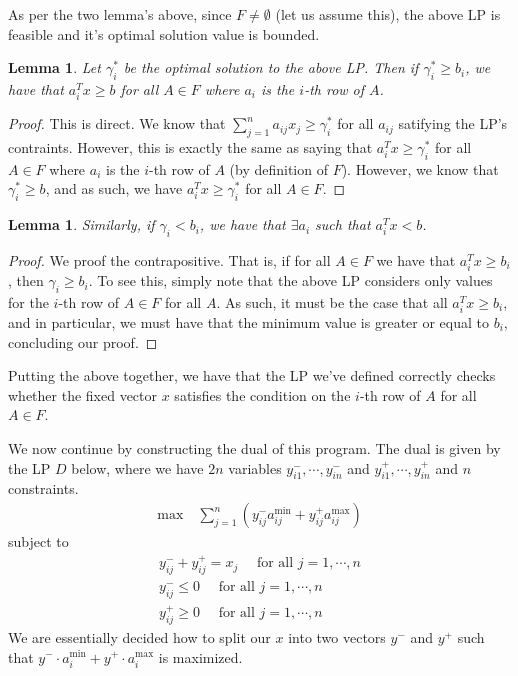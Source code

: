 \documentclass[12pt]{exam}
\newtheorem{lemma}[theorem]{Lemma}
\begin{document}
\begin{questions}
\begin{solution}
\begin{enumerate}[label=(\alph*)]
    As per the two lemma's above, since $F \neq \emptyset$ (let us assume this), the above LP is feasible and it's optimal solution value is bounded.

    \begin{lemma}
      Let $\gamma^*_i$ be the optimal solution to the above LP. Then if $\gamma_i^* \geq b_i$, we have that $a_i^Tx \geq b$ for all $A \in F$ where $a_i$ is the $i$-th row of $A$.
    \end{lemma}
    \begin{proof}
      This is direct. We know that $\sum_{j=1}^n a_{ij} x_j \geq \gamma_i^*$ for all $a_{ij}$ satifying the LP's contraints. However, this is exactly the same as saying that $a_i^T x \geq \gamma_i^*$ for all $A \in F$ where $a_i$ is the $i$-th row of $A$ (by definition of $F$). However, we know that $\gamma_i^* \geq b$, and as such, we have $a_i^T x \geq \gamma_i^*$ for all $A \in F$.
    \end{proof}

    \begin{lemma}
      Similarly, if $\gamma_i < b_i$, we have that $\exists a_i$ such that $a_i^Tx < b$.
    \end{lemma}
    \begin{proof}
      We proof the contrapositive. That is, if for all $A \in F$ we have that $a_i^Tx \geq b_i$, then $\gamma_i \geq b_i$. To see this, simply note that the above LP considers only values for the $i$-th row of $A \in F$ for all $A$. As such, it must be the case that all $a_i^Tx \geq b_i$, and in particular, we must have that the minimum value is greater or equal to $b_i$, concluding our proof.
    \end{proof}

    Putting the above together, we have that the LP we've defined correctly checks whether the fixed vector $x$ satisfies the condition on the $i$-th row of $A$ for all $A \in F$.

    We now continue by constructing the dual of this program. The dual is given by the LP $D$ below, where we have $2n$ variables $y^{-}_{i1}, \cdots, y^{-}_{in}$ and $y^{+}_{i1}, \cdots, y^{+}_{in}$ and $n$ constraints.
    \begin{align}
      \text{max} \quad \sum_{j=1}^n (y^{-}_{ij} a^{\min}_{ij} + y_{ij}^{+}a_{ij}^{\max})
    \end{align}
    subject to
    \begin{align}
      y_{ij}^- + y_{ij}^+ = x_j \quad \text{ for all } j = 1, \cdots, n \\
      y_{ij}^- \leq 0 \quad \text{ for all } j = 1, \cdots, n \\
      y_{ij}^+ \geq 0 \quad \text{ for all } j = 1, \cdots, n
    \end{align}
    We are essentially decided how to split our $x$ into two vectors $y^-$ and $y^+$ such that $ y^- \cdot a_i^{\min} + y^+ \cdot a_i^{\max}$ is maximized.


\end{enumerate}
\end{solution}
\end{questions}
\end{document}
